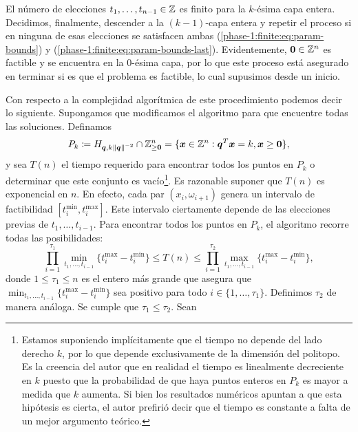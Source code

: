 El número de elecciones $t_1, \ldots, t_{n - 1} \in \mathbb{Z}$ es finito para la $k$-ésima capa entera.
Decidimos, finalmente, descender a la $(k - 1)$-capa entera y repetir el proceso si en ninguna de esas
elecciones se satisfacen ambas (\ref{phase-1:finite:eq:param-bounds}) y
(\ref{phase-1:finite:eq:param-bounds-last}). Evidentemente, $\boldsymbol{0} \in \mathbb{Z}^n$ es factible y se
encuentra en la 0-ésima capa, por lo que este proceso está asegurado en terminar si es que el
problema es factible, lo cual supusimos desde un inicio.

Con respecto a la complejidad algorítmica de este procedimiento podemos decir lo siguiente.
Supongamos que modificamos el algoritmo para que encuentre todas las soluciones. Definamos
\begin{equation}
	\label{phase-1:def:feasible-layer}
	P_k \coloneq H_{\boldsymbol{q}, k\left\lVert \boldsymbol{q} \right\rVert^{-2}} \cap \mathbb{Z}_{\geq \boldsymbol{0}}^n
	=
	\lbrace \boldsymbol{x} \in \mathbb{Z}^n \vcentcolon \boldsymbol{q}^T\boldsymbol{x} = k, \boldsymbol{x} \geq \boldsymbol{0}
	\rbrace,
\end{equation}
y sea $T(n)$ el tiempo requerido para encontrar todos los puntos en $P_k$ o determinar que este
conjunto es vacío\footnote{Estamos suponiendo implícitamente que el tiempo no depende del lado
	derecho $k$, por lo que depende exclusivamente de la dimensión del politopo. Es la creencia del
	autor que en realidad el tiempo es linealmente decreciente en $k$ puesto que la probabilidad de
	que haya puntos enteros en $P_k$ es mayor a medida que $k$ aumenta. Si bien los resultados
	numéricos apuntan a que esta hipótesis es cierta, el autor prefirió decir que el tiempo es
constante a falta de un mejor argumento teórico.}. Es razonable suponer que $T(n)$ es exponencial en
$n$. En efecto, cada par $(x_i, \omega_{i + 1})$ genera un intervalo de factibilidad $[t_i^{\min},
t_i^{\max}]$. Este intervalo ciertamente depende de las elecciones previas de $t_1, \ldots, t_{i -
1}$. Para encontrar todos los puntos en $P_k$, el algoritmo recorre todas las posibilidades:
\begin{equation}
	\label{phase-1:complexity:bounds}
	\prod_{i=1}^{\tau_1} \min_{t_1, \ldots, t_{i-1}} \lbrace t_i^{\max} - t_i^{\min} \rbrace
	\leq T(n) \leq
	\prod_{i=1}^{\tau_2} \max_{t_1, \ldots, t_{i-1}} \lbrace t_i^{\max} - t_i^{\min} \rbrace,
\end{equation}
donde $1 \leq \tau_1 \leq n$ es el entero más grande que asegura que  $\min_{t_1, \ldots, t_{i -
1}}\lbrace t_i^{\max} - t_i^{\min} \rbrace$ sea positivo para todo $i \in \lbrace 1, \ldots, \tau_1
\rbrace$. Definimos $\tau_2$ de manera análoga. Se cumple que $\tau_1 \leq \tau_2$. Sean

